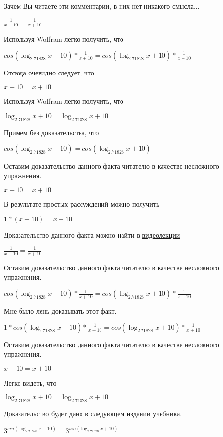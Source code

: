 \documentclass[12pt,a4paper,fleqn]{article}
\theoremstyle{definition}
\begin{document}
Зачем Вы читаете эти комментарии, в них нет никакого смысла... 

$\frac{ 1 }{ x  +  10 }
 = \frac{ 1 }{ x  +  10 }
$

Используя Wolfram легко получить, что 

$cos(\log_{ 2.71828 }{ x  +  10 }) * \frac{ 1 }{ x  +  10 }
 = cos(\log_{ 2.71828 }{ x  +  10 }) * \frac{ 1 }{ x  +  10 }
$

Отсюда очевидно следует, что 

$ x  +  10  =  x  +  10 $

Используя Wolfram легко получить, что 

$\log_{ 2.71828 }{ x  +  10 } = \log_{ 2.71828 }{ x  +  10 }$

Примем без доказательства, что 

$cos(\log_{ 2.71828 }{ x  +  10 }) = cos(\log_{ 2.71828 }{ x  +  10 })$

Оставим доказательство данного факта читателю в качестве несложного упражнения. 

$ x  +  10  =  x  +  10 $

В результате простых рассуждений можно получить 

$ 1  * ( x  +  10 ) =  x  +  10 $

Доказательство данного факта можно найти в \href{https://www.youtube.com/watch?v=dQw4w9WgXcQ}{видеолекции} 

$\frac{ 1 }{ x  +  10 }
 = \frac{ 1 }{ x  +  10 }
$

Оставим доказательство данного факта читателю в качестве несложного упражнения. 

$cos(\log_{ 2.71828 }{ x  +  10 }) * \frac{ 1 }{ x  +  10 }
 = cos(\log_{ 2.71828 }{ x  +  10 }) * \frac{ 1 }{ x  +  10 }
$

Мне было лень доказывать этот факт.

$ 1  * cos(\log_{ 2.71828 }{ x  +  10 }) * \frac{ 1 }{ x  +  10 }
 = cos(\log_{ 2.71828 }{ x  +  10 }) * \frac{ 1 }{ x  +  10 }
$

Оставим доказательство данного факта читателю в качестве несложного упражнения. 

$ x  +  10  =  x  +  10 $

Легко видеть, что 

$\log_{ 2.71828 }{ x  +  10 } = \log_{ 2.71828 }{ x  +  10 }$

Доказательство будет дано в следующем издании учебника. 

${ 3 }^{sin(\log_{ 2.71828 }{ x  +  10 })} = { 3 }^{sin(\log_{ 2.71828 }{ x  +  10 })}$
\end{document}
